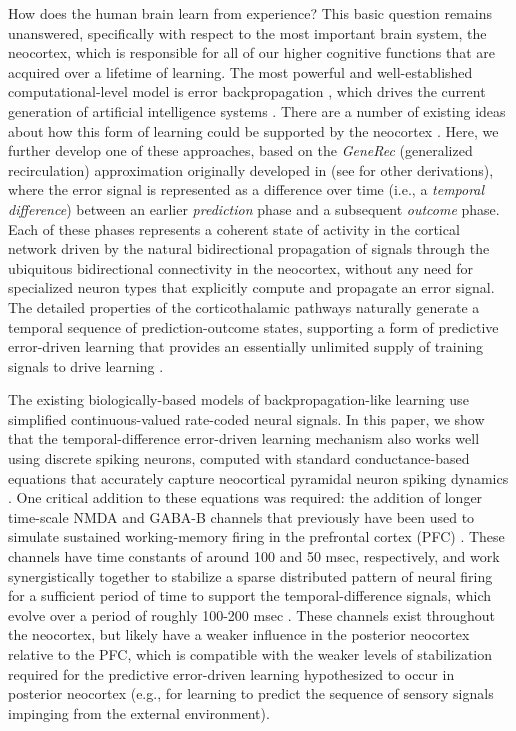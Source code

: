 \documentclass[11pt,twoside]{article}
\newif\myifpdf
\begin{document}
How does the human brain learn from experience?  This basic question remains unanswered, specifically with respect to the most important brain system, the neocortex, which is responsible for all of our higher cognitive functions that are acquired over a lifetime of learning.  The most powerful and well-established computational-level model is error backpropagation \citep{RumelhartHintonWilliams86}, which drives the current generation of artificial intelligence systems \citep{LeCunBengioHinton15}.  There are a number of existing ideas about how this form of learning could be supported by the neocortex \citep{WhittingtonBogacz19,LillicrapSantoroMarrisEtAl20}.  Here, we further develop one of these approaches, based on the \textit{GeneRec} (generalized recirculation) approximation originally developed in \citet{OReilly96} (see \citealp{XieSeung03,ScellierBengio17} for other derivations), where the error signal is represented as a difference over time (i.e., a \textit{temporal difference}) between an earlier \textit{prediction} phase and a subsequent \textit{outcome} phase.  Each of these phases represents a coherent state of activity in the cortical network driven by the natural bidirectional propagation of signals through the ubiquitous bidirectional connectivity in the neocortex, without any need for specialized neuron types that explicitly compute and propagate an error signal.  The detailed properties of the corticothalamic pathways naturally generate a temporal sequence of prediction-outcome states, supporting a form of predictive error-driven learning that provides an essentially unlimited supply of training signals to drive learning \citep{OReillyRussinZolfagharEtAl21}.

The existing biologically-based models of backpropagation-like learning use simplified continuous-valued rate-coded neural signals.  In this paper, we show that the temporal-difference error-driven learning mechanism also works well using discrete spiking neurons, computed with standard conductance-based equations that accurately capture neocortical pyramidal neuron spiking dynamics \citep{BretteGerstner05,GerstnerNaud09}.  One critical addition to these equations was required: the addition of longer time-scale NMDA and GABA-B channels that previously have been used to simulate sustained working-memory firing in the prefrontal cortex (PFC) \citep{SandersBerendsMajorEtAl13}.  These channels have time constants of around 100 and 50 msec, respectively, and work synergistically together to stabilize a sparse distributed pattern of neural firing for a sufficient period of time to support the temporal-difference signals, which evolve over a period of roughly 100-200 msec \citep{OReillyRussinZolfagharEtAl21}.  These channels exist throughout the neocortex, but likely have a weaker influence in the posterior neocortex relative to the PFC, which is compatible with the weaker levels of stabilization required for the predictive error-driven learning hypothesized to occur in posterior neocortex (e.g., for learning to predict the sequence of sensory signals impinging from the external environment).
\end{document}
